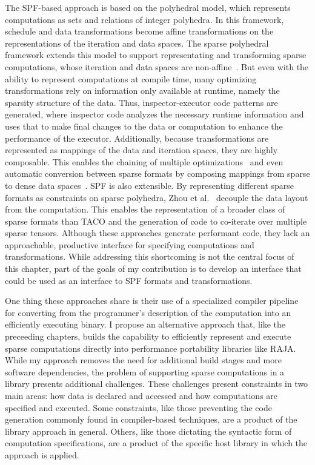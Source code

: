 The SPF-based approach is based on the polyhedral model, which represents computations as sets and relations of integer polyhedra. 
In this framework, schedule and data transformations become affine transformations on the representations of the iteration and data spaces.
The sparse polyhedral framework extends this model to support representating and transforming sparse computations, whose iteration and data spaces are non-affine~\cite{strout2016approach}. 
But even with the ability to represent computations at compile time, many optimizing transformations rely on information only available at runtime, namely the sparsity structure of the data.
Thus, inspector-executor code patterns are generated, where inspector code analyzes the necessary runtime information and uses that to make final changes to the data or computation to enhance the performance of the executor.
Additionally, because transformations are represented as mappings of the data and iteration spaces, they are highly composable. This enables the chaining of multiple optimizations~\cite{ahmad2017optimizing} and even automatic conversion between sparse formats by composing mappings from sparse to dense data spaces~\cite{popoola2023code}. 
SPF is also extensible. By representing different sparse formats as constraints on sparse polyhedra, Zhou et al.~\cite{zhao2022polyhedral} decouple the data layout from the computation. 
This enables the representation of a broader class of sparse formats than TACO and the generation of code to co-iterate over multiple sparse tensors.
Although these approaches generate performant code, they lack an approachable, productive interface for specifying computations and transformations. 
While addressing this shortcoming is not the central focus of this chapter, part of the goals of my contribution is to develop an interface that could be used as an interface to SPF formats and transformations.

One thing these approaches share is their use of a specialized compiler pipeline for converting from the programmer's description of the computation into an efficiently executing binary. 
I propose an alternative approach that, like the preceeding chapters, builds the capability to efficiently represent and execute sparse computations directly into performance portability libraries like RAJA. 
While my approach removes the need for additional build stages and more software dependencies, the problem of supporting sparse computations in a library presents additional challenges.
These challenges present constraints in two main areas: how data is declared and accessed and how computations are specified and executed. 
Some constraints, like those preventing the code generation commonly found in compiler-based techniques, are a product of the library approach in general.
Others, like those dictating the syntactic form of computation specifications, are a product of the specific host library in which the approach is applied.





